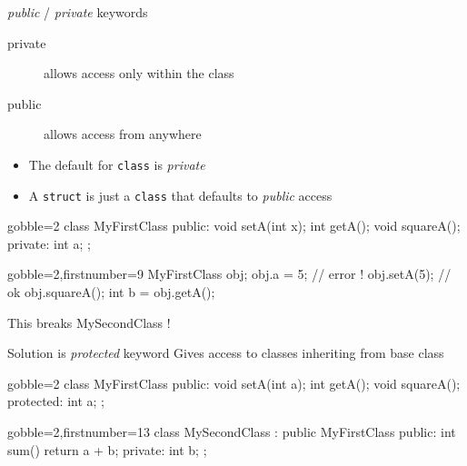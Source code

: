 \begin{frame}[fragile]
  \begin{block}{{\it public} \color{white} / {\it private} keywords}
    \begin{description}
      \item[private] allows access only within the class
      \item[public] allows access from anywhere
    \end{description}
    \begin{itemize}
       \item The default for \texttt{class} is {\it private}
       \item A \texttt{struct} is just a \texttt{class} that defaults to {\it public} access
    \end{itemize}
  \end{block}
  \pause
  \begin{multicols}{2}
    \begin{cppcode*}{gobble=2}
      class MyFirstClass {
      public:
        void setA(int x);
        int getA();
        void squareA();
      private:
        int a;
      };
    \end{cppcode*}
    \columnbreak
    \begin{cppcode*}{gobble=2,firstnumber=9}
      MyFirstClass obj;
      obj.a = 5;   // error !
      obj.setA(5); // ok
      obj.squareA();
      int b = obj.getA();
    \end{cppcode*}
    \pause
    \begin{tcolorbox}[left=0mm,right=0mm,top=0mm,bottom=0mm,colback=red!5!white,colframe=red!75!black]
      This breaks MySecondClass !
    \end{tcolorbox}
  \end{multicols}
\end{frame}

\begin{frame}[fragile]
  \begin{block}{Solution is {\it protected} keyword}
    Gives access to classes inheriting from base class
  \end{block}
  \begin{multicols}{2}
    \begin{cppcode*}{gobble=2}
      class MyFirstClass {
      public:
        void setA(int a);
        int getA();
        void squareA();
      protected:
        int a;
      };
    \end{cppcode*}
    \columnbreak
    \begin{cppcode*}{gobble=2,firstnumber=13}
      class MySecondClass :
        public MyFirstClass {
      public:
        int sum() {
          return a + b;
        }
      private:
        int b;
      };
    \end{cppcode*}
  \end{multicols}
\end{frame}

